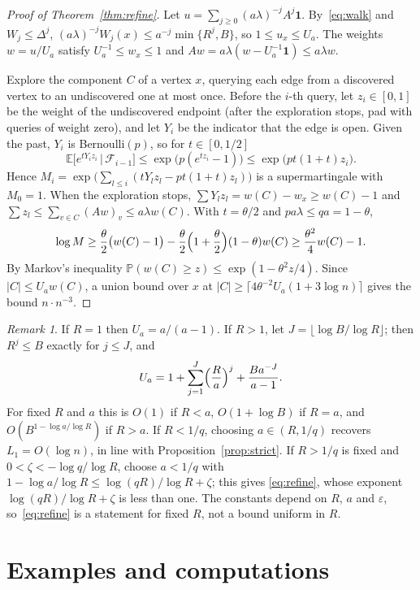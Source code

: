 \documentclass[11pt]{amsart}
\theoremstyle{remark}
\newtheorem{remark}[theorem]{Remark}
\newcommand{\PP}{\mathbb{P}}
\newcommand{\EE}{\mathbb{E}}
\newcommand{\one}{\mathbf{1}}
\begin{document}
\begin{proof}[Proof of Theorem~\ref{thm:refine}]
Let $u=\sum_{j\ge0}(a\lambda)^{-j}A^j\one$. By~\eqref{eq:walk} and $W_j\le\Delta^j$, $(a\lambda)^{-j}W_j(x)\le
a^{-j}\min\{R^j,B\}$, so $1\le u_x\le U_a$. The weights $w=u/U_a$ satisfy $U_a^{-1}\le w_x\le1$ and
$Aw=a\lambda(w-U_a^{-1}\one)\le a\lambda w$.

Explore the component $C$ of a vertex $x$, querying each edge from a discovered vertex to an undiscovered one at most
once. Before the $i$-th query, let $z_i\in[0,1]$ be the weight of the undiscovered endpoint (after the exploration
stops, pad with queries of weight zero), and let $Y_i$ be the indicator that the edge is open. Given the past, $Y_i$ is
Bernoulli$(p)$, so for $t\in[0,1/2]$
\[
\EE\bigl[e^{tY_iz_i}\,\big|\,\mathcal F_{i-1}\bigr]\le\exp\bigl(p(e^{tz_i}-1)\bigr)\le\exp\bigl(pt(1+t)z_i\bigr).
\]
Hence $M_i=\exp\bigl(\sum_{l\le i}(tY_lz_l-pt(1+t)z_l)\bigr)$ is a supermartingale with $M_0=1$. When the exploration
stops, $\sum Y_lz_l=w(C)-w_x\ge w(C)-1$ and $\sum z_l\le\sum_{v\in C}(Aw)_v\le a\lambda w(C)$. With $t=\theta/2$ and
$pa\lambda\le qa=1-\theta$,
\[
\log M\ge\frac\theta2\bigl(w(C)-1\bigr)-\frac\theta2\Bigl(1+\frac\theta2\Bigr)(1-\theta)w(C)\ge\frac{\theta^2}4w(C)-1.
\]
By Markov's inequality $\PP(w(C)\ge z)\le\exp(1-\theta^2z/4)$. Since $|C|\le U_aw(C)$, a union bound over $x$ at
$|C|\ge\lceil4\theta^{-2}U_a(1+3\log n)\rceil$ gives the bound $n\cdot n^{-3}$.
\end{proof}

\begin{remark}\label{rem:exponent}
If $R=1$ then $U_a=a/(a-1)$. If $R>1$, let $J=\lfloor\log B/\log R\rfloor$; then $R^j\le B$ exactly for $j\le J$, and
\[
U_a=1+\sum_{j=1}^{J}\Bigl(\frac Ra\Bigr)^j+\frac{Ba^{-J}}{a-1}.
\]
For fixed $R$ and $a$ this is $O(1)$ if $R<a$, $O(1+\log B)$ if $R=a$, and $O(B^{1-\log a/\log R})$ if $R>a$. If
$R<1/q$, choosing $a\in(R,1/q)$ recovers $L_1=O(\log n)$, in line with Proposition~\ref{prop:strict}. If $R>1/q$ is
fixed and $0<\zeta<-\log q/\log R$, choose $a<1/q$ with $1-\log a/\log R\le\log(qR)/\log R+\zeta$; this gives
\eqref{eq:refine}, whose exponent $\log(qR)/\log R+\zeta$ is less than one. The constants depend on $R$, $a$ and
$\varepsilon$, so~\eqref{eq:refine} is a statement for fixed $R$, not a bound uniform in $R$.
\end{remark}

\section{Examples and computations}\label{sec:examples}
\end{document}
